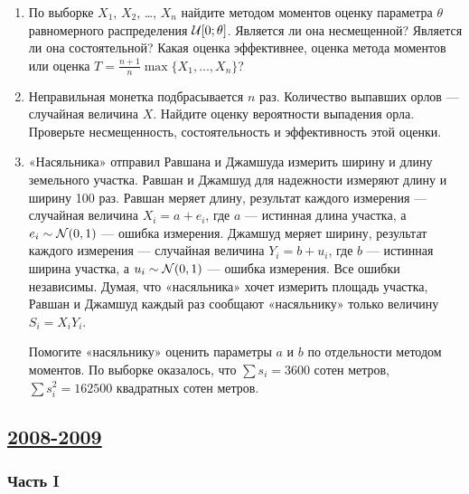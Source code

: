 \begin{enumerate}
\item По выборке $X_1$, $X_2$, \ldots, $X_n$ найдите методом моментов оценку параметра $\theta$ равномерного распределения $\mathcal{U}[0;\theta]$. Является ли она несмещенной? Является ли она состоятельной? Какая оценка эффективнее, оценка метода моментов или оценка $T=\frac{n+1}{n}\max\{X_1,\ldots,X_n\}$?
\item Неправильная монетка подбрасывается $n$ раз. Количество выпавших орлов — случайная величина $X$.  Найдите оценку вероятности выпадения орла. Проверьте несмещенность, состоятельность и эффективность этой оценки.
\item «Насяльника» отправил Равшана и Джамшуда измерить ширину и длину земельного участка. Равшан и Джамшуд для надежности измеряют длину и ширину 100 раз. Равшан меряет длину, результат каждого измерения — случайная величина $X_i=a+e_i$, где $a$ — истинная длина участка, а $e_i\sim \mathcal{N}(0,1)$ — ошибка измерения. Джамшуд меряет ширину, результат каждого измерения — случайная величина $Y_i=b+u_i$, где $b$ — истинная ширина участка, а $u_i\sim \mathcal{N}(0,1)$ — ошибка измерения. Все ошибки независимы. Думая, что «насяльника» хочет измерить площадь участка, Равшан и Джамшуд каждый раз сообщают «насяльнику» только величину $S_i = X_iY_i$.

Помогите «насяльнику» оценить параметры $a$ и $b$ по отдельности методом моментов. По выборке оказалось, что $\sum s_i=3600$ сотен метров, $\sum s_i^2 =162500$ квадратных сотен метров.
\end{enumerate}







\subsection[2008-2009]{\hyperref[sec:sol_kr_03_2008_2009]{2008-2009}}
\label{sec:kr_03_2008_2009}

\subsubsection*{Часть I}

